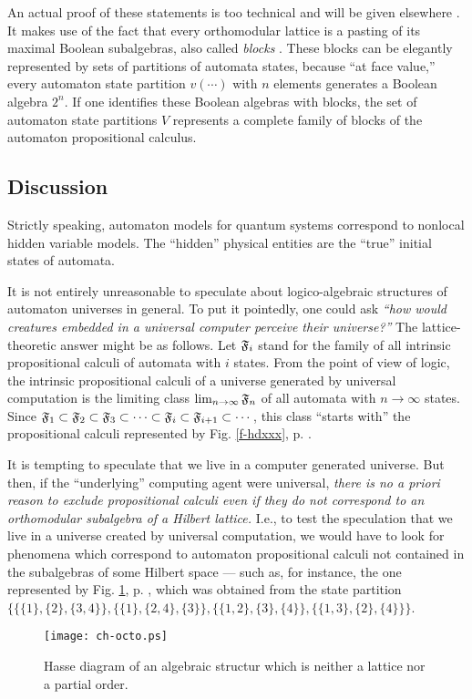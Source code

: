 \documentclass{article}
\begin{document}
An actual proof of these statements is too technical and will be given
elsewhere \cite{svozil-book}.
It makes use of the fact that
every orthomodular lattice is a
pasting
of its maximal Boolean subalgebras, also called {\em blocks}
\cite{kalmbach-83,Navara}.
These blocks can be elegantly represented by
sets of partitions of automata states, because
``at face value,'' every automaton state partition $v(\cdots
)$ with
$n$ elements generates a Boolean algebra $2^n$. If one identifies
these Boolean algebras with blocks, the
set of automaton state partitions $V$ represents a complete
family of blocks of the automaton propositional calculus.


\subsection{Discussion}
Strictly speaking, automaton models for quantum systems
correspond to nonlocal hidden variable models.
The ``hidden'' physical entities are the ``true'' initial states
of automata.

It is not entirely unreasonable to speculate about logico-algebraic
structures of automaton universes in general. To put it pointedly, one
could ask
{\em ``how would creatures embedded in a universal computer perceive
their universe?''}
The lattice-theoretic  answer might be as follows. Let
${\frak F}_i$ stand for the family of all intrinsic propositional calculi
of automata with $i$ states.
 From the point
of view of logic, the intrinsic propositional calculi of a
universe
generated by
universal computation
is the limiting class  $\lim_{n\rightarrow \infty }{\frak F}_n$ of
all automata with $n \rightarrow \infty$ states.
Since
$
{\frak F}_1
\subset
{\frak F}_2
\subset
{\frak F}_3
\subset
\cdots
\subset
{\frak F}_i
\subset
{\frak F}_{i+1}
\subset
\cdots
$, this class ``starts with'' the propositional calculi represented by
Fig.
 \ref{f-hdxxx}, p.
 \pageref{f-hdxxx}.


It is tempting to speculate that we live in a computer
generated universe. But then, if the ``underlying'' computing
agent were universal,
{\em there
is no {\it a priori} reason to exclude propositional calculi even if
they
do not correspond to an orthomodular subalgebra of a Hilbert lattice.}
I.e., to test the speculation that we live in a universe created by
universal computation,
we
would have to look for phenomena which correspond
to automaton propositional calculi not contained in the subalgebras of
some
Hilbert space --- such as, for instance,  the one represented by Fig.
 \ref{f:noa.pic2}, p.
 \pageref{f:noa.pic2}, which was obtained from  the state partition
$
\{\{\{1\}, \{2\}, \{3, 4\}\},  \{\{1\}, \{2, 4\}, \{3\}\}, \{\{1, 2\},
\{3\}, \{4\}\},
   \{\{1, 3\}, \{2\}, \{4\}\}\}
$.
\begin{figure}
\texttt{[image: ch-octo.ps]}
\caption{Hasse diagram of an algebraic structur which is neither a
lattice nor a partial order.
 \label{f:noa.pic2}}
\end{figure}
\end{document}

